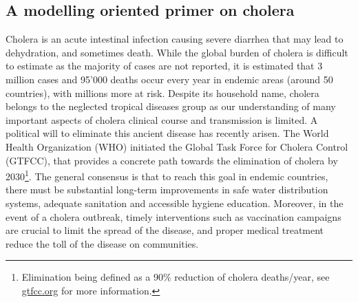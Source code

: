 \begin{fullwidth}
\chapter{A modelling oriented primer on cholera}
\end{fullwidth}
Cholera is an acute intestinal infection causing severe diarrhea that may lead to dehydration, and sometimes death. While the global burden of cholera is difficult to estimate as the majority of cases are not reported, it is estimated that 3 million cases and 95'000 deaths occur every year in endemic areas (around 50 countries), with millions more at risk\cite[-1\baselineskip]{Ali:UpdatedGlobalBurden:2015}. Despite its household name, cholera belongs to the neglected tropical diseases group as our understanding of many important aspects of cholera clinical course and transmission is limited.
A political will to eliminate this ancient disease has recently arisen. The World Health Organization (WHO) initiated the Global Task Force for Cholera Control (GTFCC), that provides a concrete path towards the elimination of cholera by 2030\footnote[][-3\baselineskip]{Elimination being defined as a 90\% reduction of cholera deaths/year, see \url{gtfcc.org} for more information.}. The general consensus is that to reach this goal in endemic countries, there must be substantial long-term improvements in safe water distribution systems, adequate sanitation and accessible hygiene education. Moreover, in the event of a cholera outbreak, timely interventions such as vaccination campaigns are crucial to limit the spread of the disease, and proper medical treatment reduce the toll of the disease on communities. %


\vspace{.7cm}
